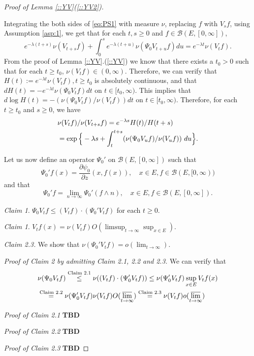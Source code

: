 \documentclass[12pt,a4paper]{amsart}
\numberwithin{equation}{section}
\theoremstyle{plain}
\theoremstyle{definition}
\theoremstyle{remark}
\newtheorem{claim}[thm]{Claim}
\newenvironment{proof*}[1][\proofname]{
  \renewcommand\qedsymbol{$\blacksquare$}
  \begin{proof}[#1]}{\end{proof}}
\begin{document}
\begin{proof}[Proof of Lemma \ref{::YV}(\ref{::YV2})]
\begin{proof*}
 Integrating the both sides of \eqref{eq:PS1} with measure $\nu$, replacing $f$ with $V_sf$, using Assumption \ref{asp:1}, we get that for each $t,s\geq 0$ and $f\in \mathcal B(E,[0,\infty])$,
\[
  e^{-\lambda (t+s)}\nu (V_{t+s}f) + \int_0^s e^{-\lambda (t+u)}\nu (\Psi_0 V_{t+u} f) du
  = e^{-\lambda t}\nu (V_tf).
\]
From the proof of Lemma \ref{::YV}.(\ref{::YV}) we know that there exists a $t_0>0$ such that for each $t\geq t_0$, $\nu(V_tf)\in (0,\infty)$. Therefore, we can verify that $H(t):= e^{- \lambda t}\nu(V_tf), t\geq t_0$ is absolutely continuous, and that $d H(t) = -  e^{- \lambda t} \nu(\Psi_0 V_t f) dt $ on $t \in [t_0, \infty).$ This implies that $ d \log H(t) = -  (\nu(\Psi_0 V_t f)/ \nu(V_tf)) dt$ on $t \in [t_0, \infty).$ Therefore, for each $t\geq t_0$ and $s\geq 0$, we have
\begin{align}
  & \nu (V_tf) / \nu (V_{t+s}f) 
  = e^{- \lambda s} H(t)/H(t+s) 
  \\ & = \exp\Big\{ -\lambda s +  \int_t^{t+s} (\nu (\Psi_0 V_u f)/ \nu (V_uf)) ~du \Big\}.
  \qedhere
\end{align}
\end{proof*}
  
Let us now define an operator $\Psi_0'$ on $\mathcal B(E,[0,\infty])$ such that
\[
  \Psi_0'f(x) = \frac{\partial \psi_0}{\partial z} (x, f(x)), \quad x\in E, f \in \mathcal B(E,[0,\infty))  
\]
and that
\[
  \Psi_0' f 
  = \lim_{n\to \infty} \Psi_0' (f\wedge n),
  \quad x\in E,f\in \mathcal B(E,[0,\infty]).
\]

\begin{claim} \(\Psi_0 V_tf \leq (V_tf) \cdot (\Psi_0' V_tf)\) for each $t\geq 0$. \end{claim}

\begin{claim} $V_tf(x) = \nu( V_{t}f)O(\limsup_{t\to \infty}\sup_{x\in E}) $. \end{claim}

\emph{Claim 2.3.} We show that $\nu(\Psi_0' V_t f) = o(\lim_{t\to \infty})$. 

\emph{Proof of Claim 2 by admitting Claim 2.1, 2.2 and 2.3.} We can verify that
\begin{align}
  & \nu(\Psi_0 V_tf)
    \overset{\text{Claim 2.1}} \leq \nu ((V_tf) \cdot (\Psi_0' V_t f) )
    \leq \nu(\Psi_0' V_t f)\sup_{x\in E} V_tf(x)
  \\ & \overset{\text{Claim 2.2}} = \nu(\Psi_0' V_t f)\nu(V_tf) O(\varlimsup_{t\to \infty})
       \overset{\text{Claim 2.3}} = \nu(V_tf) o(\varlimsup_{t\to \infty})
\end{align}

\emph{Proof of Claim 2.1} \textbf{TBD}

\emph{Proof of Claim 2.2} \textbf{TBD}

\emph{Proof of Claim 2.3} \textbf{TBD}
\end{proof}
\end{document}
